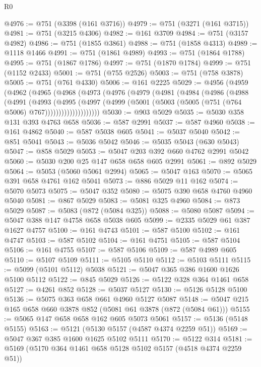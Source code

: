 \begin{lexlean}{R0}
\begin{coremodule}
@4976 := @751 (@3398 (@161 @3716))
@4979 := @751 (@3271 (@161 @3715))
@4981 := @751 (@3215 @4306)
@4982 := @161 @3709
@4984 := @751 (@3157 @4982)
@4986 := @751 (@1855 @3861)
@4988 := @751 (@1858 @4313)
@4989 := @1118 @1466
@4991 := @751 (@1861 @4989)
@4993 := @751 (@1864 @1788)
@4995 := @751 (@1867 @1786)
@4997 := @751 (@1870 @1784)
@4999 := @751 (@1152 @2433)
@5001 := @751 (@755 @2526)
@5003 := @751 (@758 @3878)
@5005 := @751 (@761 @4330)
@5006 := @161 @2225
@5029 := @4956
    (@4959
      (@4962
        (@4965
          (@4968
            (@4973
              (@4976
                (@4979
                  (@4981
                    (@4984
                      (@4986
                        (@4988
                          (@4991
                            (@4993
                              (@4995
                                (@4997
                                  (@4999
                                    (@5001 (@5003 (@5005 (@751 (@764 @5006) @767))))))))))))))))))))
@5030 := @903 @5029
@5035 := @5030 @358 @131 @393 @4763 @658
@5036 := @587 @2991
@5037 := @587 @4960
@5038 := @161 @4862
@5040 := @587 @5038 @605
@5041 := @5037 @5040
@5042 := @851 @5041
@5043 := @5036 @5042
@5046 := @5035 @5043 (@630 @5043)
@5047 := @858 @5029
@5053 := @5047 @203 @392 @660 @4762 @2991 @5042
@5060 := @5030 @200 @25 @147 @658 @658 @605 @2991
@5061 := @892 @5029
@5064 := @5053 (@5060 @5061 @2994)
@5065 := @5047 @163
@5070 := @5065 @391 @658 @4761 @162 @5041
@5073 := @886 @5029 @11 @162
@5074 := @5070 @5073
@5075 := @5047 @352
@5080 := @5075 @390 @658 @4760 @4960 @5040
@5081 := @867 @5029
@5083 := @5081 @325 @4960
@5084 := @873 @5029
@5087 := @5083 (@872 (@5084 @325))
@5088 := @5080 @5087
@5094 := @5047 @388 @147 @4758 @658 @5038 @605
@5099 := @2335 @5029 @61 @387 @1627 @4757
@5100 := @161 @4743
@5101 := @587 @5100
@5102 := @161 @4747
@5103 := @587 @5102
@5104 := @161 @4751
@5105 := @587 @5104
@5106 := @161 @4755
@5107 := @587 @5106
@5109 := @587 @4989 @605
@5110 := @5107 @5109
@5111 := @5105 @5110
@5112 := @5103 @5111
@5115 := @5099 (@5101 @5112) @5038
@5121 := @5047 @365 @386 @1600 @1626 @5100 @5112
@5122 := @845 @5029
@5126 := @5122 @328 @364 @1461 @658
@5127 := @4261 @852
@5128 := @5037 @5127
@5130 := @5126 @5128 @5100
@5136 := @5075 @363 @658 @661 @4960 @5127 @5087
@5148 := @5047 @215 @165 @658 @660 @3878 @852 (@5081 @61 @3878 (@872 (@5084 @61)))
@5155 := @5065 @147 @658 @658 @162 @605 @5073 @5061
@5157 := @5136 (@5148 @5155)
@5163 := @5121 (@5130 @5157 (@4587 @4374 @2259 @51))
@5169 := @5047 @367 @385 @1600 @1625 @5102 @5111
@5170 := @5122 @314
@5181 := @5169 (@5170 @364 @1461 @658 @5128 @5102 @5157 (@4518 @4374 @2259 @51))

\end{coremodule}
\end{lexlean}
